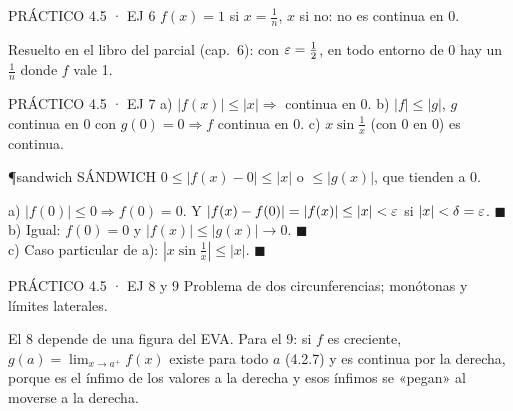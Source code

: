 \begin{enunciado}{PRÁCTICO 4.5 · EJ 6}
$f(x)=1$ si $x=\frac1n$, $x$ si no: no es continua en 0.
\end{enunciado}
Resuelto en el libro del parcial (cap.\ 6): con $\varepsilon=\frac12$, en todo entorno de 0 hay un $\frac1n$ donde $f$ vale 1.

\begin{enunciado}{PRÁCTICO 4.5 · EJ 7}
a) $|f(x)|\le|x|\Rightarrow$ continua en 0. b) $|f|\le|g|$, $g$ continua en 0 con $g(0)=0\Rightarrow f$ continua en 0. c) $x\sin\frac1x$ (con 0 en 0) es continua.
\end{enunciado}
\begin{uso}{\P{sandwich} SÁNDWICH}
$0\le|f(x)-0|\le|x|$ o $\le|g(x)|$, que tienden a 0.
\end{uso}
a) $|f(0)|\le0\Rightarrow f(0)=0$. Y $|f(x)-f(0)|=|f(x)|\le|x|<\varepsilon$ si $|x|<\delta=\varepsilon$. $\blacksquare$\\
b) Igual: $f(0)=0$ y $|f(x)|\le|g(x)|\to0$. $\blacksquare$\\
c) Caso particular de a): $|x\sin\frac1x|\le|x|$. $\blacksquare$

\begin{enunciado}{PRÁCTICO 4.5 · EJ 8 y 9}
Problema de dos circunferencias; monótonas y límites laterales.
\end{enunciado}
\begin{falta}
El 8 depende de una figura del EVA. Para el 9: si $f$ es creciente, $g(a)=\lim_{x\to a^+}f(x)$ existe para todo $a$ (4.2.7) y es continua por la derecha, porque es el ínfimo de los valores a la derecha y esos ínfimos se «pegan» al moverse a la derecha.
\end{falta}
